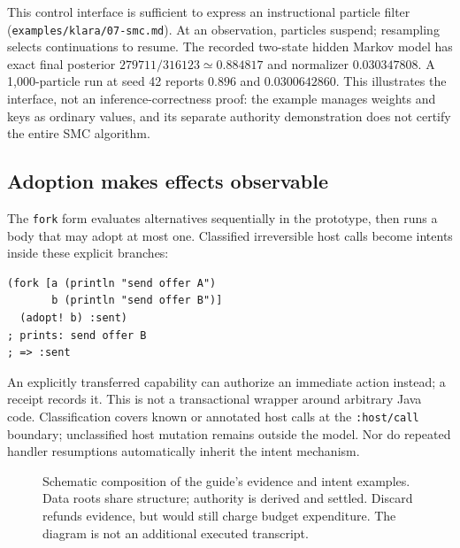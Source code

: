 \documentclass[acmsmall,screen,review,nonacm]{acmart}
\newcommand{\src}[1]{{\normalfont\nolinkurl{#1}}}
\begin{document}
This control interface is sufficient to express an instructional particle
filter (\src{examples/klara/07-smc.md}). At an observation, particles suspend;
resampling selects continuations to resume. The recorded two-state hidden
Markov model has exact final posterior $279711/316123\simeq0.884817$ and
normalizer $0.030347808$. A 1,000-particle run at seed 42 reports $0.896$ and
$0.0300642860$. This illustrates the interface, not an inference-correctness
proof: the example manages weights and keys as ordinary values, and its separate
authority demonstration does not certify the entire SMC algorithm.

\subsection{Adoption makes effects observable}
The \src{fork} form evaluates alternatives sequentially in the prototype,
then runs a body that may adopt at most one. Classified irreversible host
calls become intents inside these explicit branches:
\begin{lstlisting}
(fork [a (println "send offer A")
       b (println "send offer B")]
  (adopt! b) :sent)
; prints: send offer B
; => :sent
\end{lstlisting}
An explicitly transferred capability can authorize an immediate action instead;
a receipt records it. This is not a transactional wrapper around arbitrary
Java code. Classification covers known or annotated host calls at the
\src{:host/call} boundary; unclassified host mutation remains outside the model.
Nor do repeated handler resumptions automatically inherit the intent mechanism.

\begin{figure}[t]
\centering
{}
\caption{Schematic composition of the guide's evidence and intent examples.
Data roots share structure; authority is derived and settled. Discard refunds
evidence, but would still charge budget expenditure. The diagram is not an
additional executed transcript.}\label{fig:fork}
\end{figure}
\end{document}
